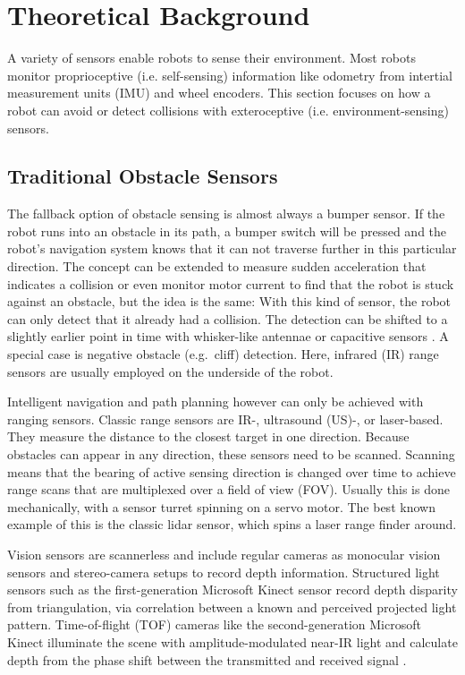 
\chapter{Theoretical Background}\label{theoretical-background}

A variety of sensors enable robots to sense their environment. Most robots monitor proprioceptive (i.e. self-sensing) information like odometry from intertial measurement units (IMU) and wheel encoders. This section focuses on how a robot can avoid or detect collisions with exteroceptive (i.e. environment-sensing) sensors.

\section{Traditional Obstacle Sensors}\label{traditional-obstacle-sensors}

The fallback option of obstacle sensing is almost always a bumper
sensor. If the robot runs into an obstacle in its path, a bumper switch
will be pressed and the robot's navigation system knows that it can not
traverse further in this particular direction. The concept can be
extended to measure sudden acceleration that indicates a collision or
even monitor motor current to find that the robot is stuck against an
obstacle, but the idea is the same: With this kind of sensor, the robot
can only detect that it already had a collision. The detection can be
shifted to a slightly earlier point in time with whisker-like
antennae or capacitive sensors \cite{Muhlbacher-Karrer2015}. A special
case is negative obstacle (e.g.~cliff) detection. Here, infrared
(IR) range sensors are usually employed on the underside of the robot.

Intelligent navigation and path planning however can only be achieved
with ranging sensors. Classic range sensors are IR-, ultrasound (US)-, or
laser-based. They measure the distance to the closest target in one
direction. Because obstacles can appear in any direction, these sensors
need to be scanned. Scanning means that the bearing of active sensing
direction is changed over time to achieve range scans that are
multiplexed over a field of view (FOV). Usually this is done
mechanically, with a sensor turret spinning on a servo motor. The best
known example of this is the classic lidar sensor, which spins a laser
range finder around.

Vision sensors are scannerless and include regular cameras as monocular
vision sensors and stereo-camera setups to record depth
information. Structured light sensors such as the first-generation
Microsoft Kinect sensor record depth disparity from triangulation, via
correlation between a known and perceived projected light pattern.
Time-of-flight (TOF) cameras like the second-generation Microsoft Kinect
illuminate the scene with amplitude-modulated near-IR light and
calculate depth from the phase shift between the transmitted and
received signal \cite{Sarbolandi2015}.

